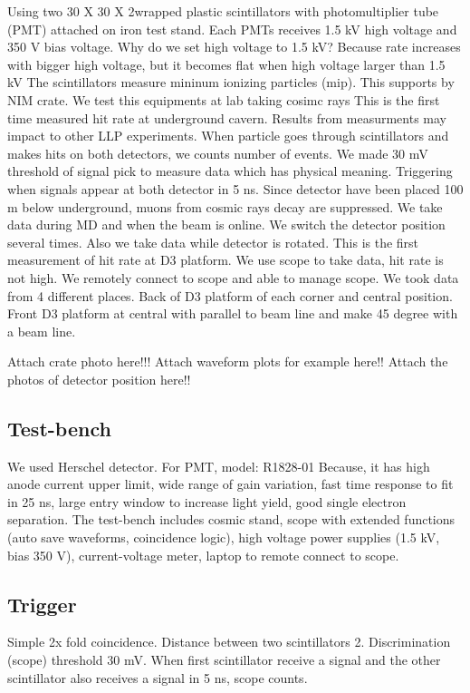 Using two 30 X 30 X 2\cm wrapped plastic scintillators with photomultiplier tube (PMT) attached on iron test stand. 
Each PMTs receives 1.5 kV high voltage and 350 V bias voltage. 
Why do we set high voltage to 1.5 kV? Because rate increases with bigger high voltage, but it becomes flat when high voltage larger than 1.5 kV
The scintillators measure mininum ionizing particles (mip).
This supports by NIM crate.
We test this equipments at lab taking cosimc rays
This is the first time measured hit rate at underground cavern.
Results from measurments may impact to other LLP experiments.
When particle goes through scintillators and makes hits on both detectors, we counts number of events. 
We made 30 mV threshold of signal pick to measure data which has physical meaning. 
Triggering when signals appear at both detector in 5 ns. 
Since detector have been placed 100 m below underground, muons from cosmic rays decay are suppressed. 
We take data during MD and when the beam is online. 
We switch the detector position several times. Also we take data while detector is rotated. 
This is the first measurement of hit rate at D3 platform. 
We use scope to take data, hit rate is not high. 
We remotely connect to scope and able to manage scope.
We took data from 4 different places. 
Back of D3 platform of each corner and central position.
Front D3 platform at central with parallel to beam line and make 45 degree with a beam line.

Attach crate photo here!!!
Attach waveform plots for example here!! 
Attach the photos of detector position here!! 

\subsection{Test-bench}
We used Herschel detector.
For PMT, model: R1828-01
Because, it has high anode current upper limit, wide range of gain variation, fast time response to fit in 25 ns, large entry window to increase light yield, good single electron separation.
The test-bench includes cosmic stand, scope with extended functions (auto save waveforms, coincidence logic), high voltage power supplies (1.5 kV, bias 350 V), current-voltage meter, laptop to remote connect to scope.

\subsection{Trigger}
Simple 2x fold coincidence. 
Distance between two scintillators 2\cm. 
Discrimination (scope) threshold 30 mV.
When first scintillator receive a signal and the other scintillator also receives a signal in 5 ns, scope counts.


